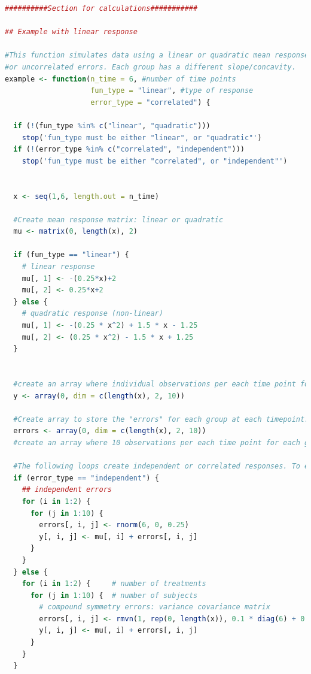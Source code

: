 \documentclass[
]{article}
\begin{document}
\begin{lstlisting}[language=R]
##########Section for calculations###########

## Example with linear response

#This function simulates data using a linear or quadratic mean response and each with correlated
#or uncorrelated errors. Each group has a different slope/concavity.
example <- function(n_time = 6, #number of time points
                    fun_type = "linear", #type of response
                    error_type = "correlated") {
  
  if (!(fun_type %in% c("linear", "quadratic")))
    stop('fun_type must be either "linear", or "quadratic"')
  if (!(error_type %in% c("correlated", "independent")))
    stop('fun_type must be either "correlated", or "independent"')
  
  
  x <- seq(1,6, length.out = n_time)
  
  #Create mean response matrix: linear or quadratic
  mu <- matrix(0, length(x), 2)
  
  if (fun_type == "linear") {
    # linear response
    mu[, 1] <- -(0.25*x)+2  
    mu[, 2] <- 0.25*x+2
  } else {
    # quadratic response (non-linear)
    mu[, 1] <- -(0.25 * x^2) + 1.5 * x - 1.25
    mu[, 2] <- (0.25 * x^2) - 1.5 * x + 1.25
  }
  
  
  #create an array where individual observations per each time point for each group are to be stored. Currently using 10 observations per timepoint
  y <- array(0, dim = c(length(x), 2, 10))
  
  #Create array to store the "errors" for each group at each timepoint. The "errors" are the between-group variability in the response.
  errors <- array(0, dim = c(length(x), 2, 10))
  #create an array where 10 observations per each time point for each group are to be stored
  
  #The following loops create independent or correlated responses. To each value of mu (mean response per group) a randomly generated error (correlated or uncorrelated) is added and thus the individual response is created.
  if (error_type == "independent") {
    ## independent errors
    for (i in 1:2) {
      for (j in 1:10) {
        errors[, i, j] <- rnorm(6, 0, 0.25)
        y[, i, j] <- mu[, i] + errors[, i, j]
      }
    }
  } else {
    for (i in 1:2) {     # number of treatments
      for (j in 1:10) {  # number of subjects
        # compound symmetry errors: variance covariance matrix
        errors[, i, j] <- rmvn(1, rep(0, length(x)), 0.1 * diag(6) + 0.25 * matrix(1, 6, 6))
        y[, i, j] <- mu[, i] + errors[, i, j]
      }
    }
  }    
  

\end{lstlisting}
\end{document}

